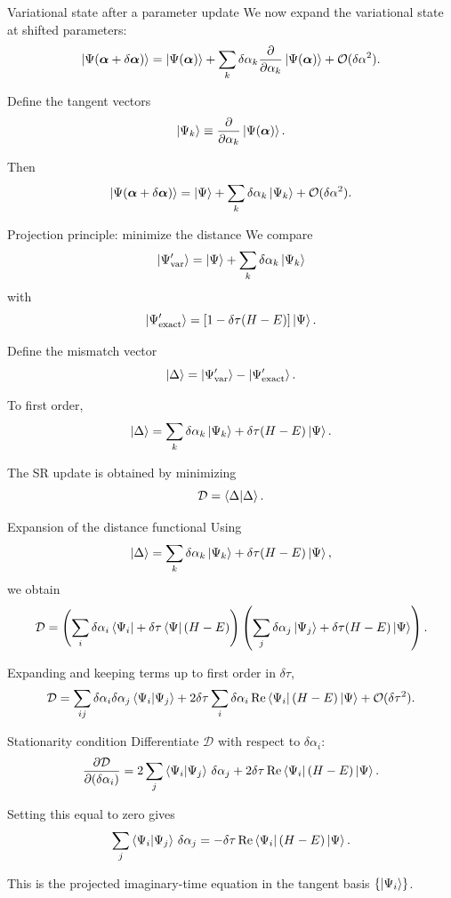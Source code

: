 \documentclass[aspectratio=169]{beamer}
\begin{document}
\begin{frame}{Variational state after a parameter update}
We now expand the variational state at shifted parameters:
\[
\ket{\Psi(\bm{\alpha}+\delta\bm{\alpha})}
=
\ket{\Psi(\bm{\alpha})}
+
\sum_k \delta\alpha_k
\pdv{}{\alpha_k}\ket{\Psi(\bm{\alpha})}
+\mathcal{O}(\delta\alpha^2).
\]

Define the tangent vectors
\[
\ket{\Psi_k}
\equiv
\pdv{}{\alpha_k}\ket{\Psi(\bm{\alpha})}.
\]

Then
\[
\ket{\Psi(\bm{\alpha}+\delta\bm{\alpha})}
=
\ket{\Psi}
+
\sum_k \delta\alpha_k \ket{\Psi_k}
+\mathcal{O}(\delta\alpha^2).
\]
\end{frame}

\begin{frame}{Projection principle: minimize the distance}
We compare
\[
\ket{\Psi_{\mathrm{var}}'}
=
\ket{\Psi}
+
\sum_k \delta\alpha_k \ket{\Psi_k}
\]
with
\[
\ket{\Psi_{\mathrm{exact}}'}
=
\left[1-\delta\tau(H-E)\right]\ket{\Psi}.
\]

Define the mismatch vector
\[
\ket{\Delta}
=
\ket{\Psi_{\mathrm{var}}'}
-
\ket{\Psi_{\mathrm{exact}}'}.
\]

To first order,
\[
\ket{\Delta}
=
\sum_k \delta\alpha_k \ket{\Psi_k}
+
\delta\tau(H-E)\ket{\Psi}.
\]

The SR update is obtained by minimizing
\[
\mathcal{D}
=
\braket{\Delta}{\Delta}.
\]
\end{frame}

\begin{frame}{Expansion of the distance functional}
Using
\[
\ket{\Delta}
=
\sum_k \delta\alpha_k \ket{\Psi_k}
+
\delta\tau(H-E)\ket{\Psi},
\]
we obtain
\[
\mathcal{D}
=
\left(
\sum_i \delta\alpha_i \bra{\Psi_i}
+
\delta\tau \bra{\Psi}(H-E)
\right)
\left(
\sum_j \delta\alpha_j \ket{\Psi_j}
+
\delta\tau (H-E)\ket{\Psi}
\right).
\]

Expanding and keeping terms up to first order in \(\delta\tau\),
\[
\mathcal{D}
=
\sum_{ij}\delta\alpha_i \delta\alpha_j \braket{\Psi_i}{\Psi_j}
+
2\delta\tau \sum_i \delta\alpha_i \Re \bra{\Psi_i}(H-E)\ket{\Psi}
+\mathcal{O}(\delta\tau^2).
\]
\end{frame}

\begin{frame}{Stationarity condition}
Differentiate \(\mathcal{D}\) with respect to \(\delta\alpha_i\):
\[
\pdv{\mathcal{D}}{(\delta\alpha_i)}
=
2\sum_j \braket{\Psi_i}{\Psi_j}\,\delta\alpha_j
+
2\delta\tau \Re \bra{\Psi_i}(H-E)\ket{\Psi}.
\]

Setting this equal to zero gives
\[
\sum_j \braket{\Psi_i}{\Psi_j}\,\delta\alpha_j
=
-\delta\tau \Re \bra{\Psi_i}(H-E)\ket{\Psi}.
\]

This is the projected imaginary-time equation in the tangent basis \(\{\ket{\Psi_i}\}\).
\end{frame}
\end{document}
